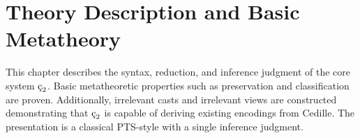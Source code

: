 \chapter{Theory Description and Basic Metatheory}


This chapter describes the syntax, reduction, and inference judgment of the core system $\ced$.
Basic metatheoretic properties such as preservation and classification are proven.
Additionally, irrelevant casts and irrelevant views are constructed demonstrating that $\ced$ is capable of deriving existing encodings from Cedille.
The presentation is a classical PTS-style with a single inference judgment.








